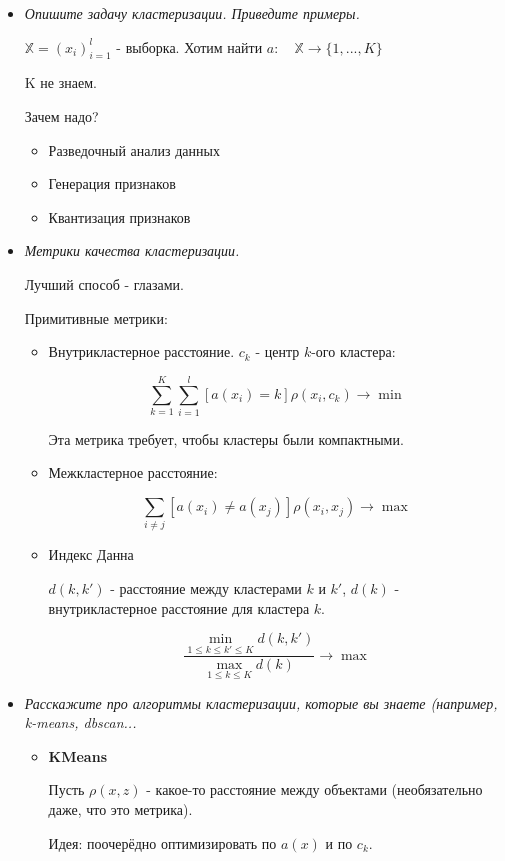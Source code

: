 \documentclass[12pt]{article}
\begin{document}
\begin{itemize}
\item \textit{Опишите задачу кластеризации. Приведите примеры.}

$\mathbb{X} = (x_i)_{i=1}^l$ - выборка.
Хотим найти $a: \quad \mathbb{X} \rightarrow \{ 1, ..., K \}$

K не знаем.

Зачем надо?
\begin{itemize}
\item Разведочный анализ данных
\item Генерация признаков
\item Квантизация признаков
\end{itemize}

\item \textit{ Метрики качества кластеризации.}

Лучший способ - глазами.

Примитивные метрики:
\begin{itemize}
\item Внутрикластерное расстояние.
$c_k$ - центр $k$-ого кластера:

\[ \sum_{k=1}^K \sum_{i=1}^l [a(x_i) = k] \rho (x_i, c_k) \rightarrow \min \]

Эта метрика требует, чтобы кластеры были компактными.

\item Межкластерное расстояние:

\[ \sum_{i \neq j} [a(x_i) \neq a(x_j)] \rho(x_i, x_j) \rightarrow \max \]

\item Индекс Данна

$d(k, k')$ - расстояние между кластерами $k$ и $k'$, $d(k)$ - внутрикластерное расстояние для кластера $k$.


\[
\frac{\min_{1 \leq k \leq k' \leq K} d(k, k')}{\max_{1 \leq k \leq K} d(k)} \rightarrow \max
\]
\end{itemize}

\item \textit{Расскажите про алгоритмы кластеризации, которые вы знаете (например, k-means,
dbscan...}

\begin{itemize}

\item \textbf{KMeans}

Пусть $\rho(x, z)$ - какое-то расстояние между объектами (необязательно даже, что это метрика).

Идея: поочерёдно оптимизировать по $a(x)$ и по $c_k$.


\end{itemize}
\end{itemize}
\end{document}
